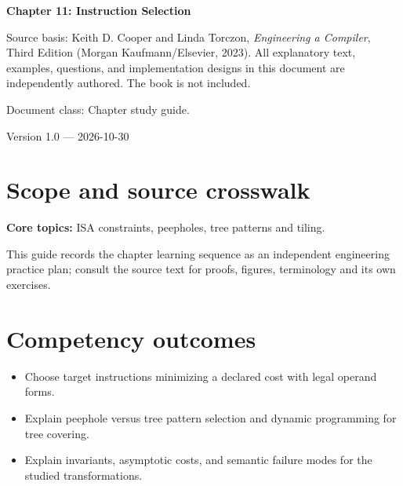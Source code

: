 \documentclass[10pt,letterpaper]{article}
\begin{document}
\begin{titlepage}
\centering\vspace*{1.0in}
{\Huge\bfseries\textcolor{CompilerBlue}{Chapter 11: Instruction Selection}\par}
\vspace{.22in}{\Large Critical reading, original exercises, evidence and review\par}
\vspace{.4in}{\large Compiler Engineering Documentation Suite\par}
\vfill
\begin{minipage}{.86\linewidth}\small
Source basis: Keith D. Cooper and Linda Torczon, \emph{Engineering a Compiler}, Third Edition (Morgan Kaufmann/Elsevier, 2023). All explanatory text, examples, questions, and implementation designs in this document are independently authored. The book is not included.\par\medskip
Document class: Chapter study guide.
\end{minipage}
\vfill\textcolor{CompilerGray}{Version 1.0 --- 2026-10-30}\par
\end{titlepage}
\tableofcontents\clearpage
\section{Scope and source crosswalk}
\textbf{Core topics:} ISA constraints, peepholes, tree patterns and tiling.

This guide records the chapter learning sequence as an independent engineering practice plan; consult the source text for proofs, figures, terminology and its own exercises.

\section{Competency outcomes}
\begin{itemize}
\item Choose target instructions minimizing a declared cost with legal operand forms.
\item Explain peephole versus tree pattern selection and dynamic programming for tree covering.
\item Explain invariants, asymptotic costs, and semantic failure modes for the studied transformations.
\end{itemize}
\end{document}
